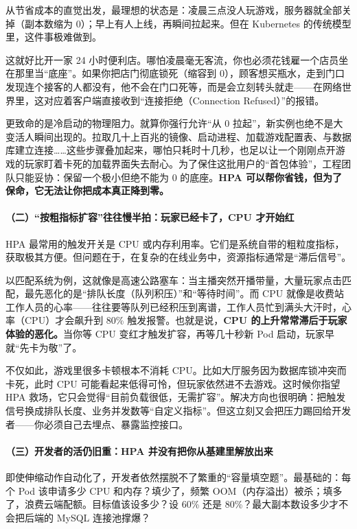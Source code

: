从节省成本的直觉出发，最理想的状态是：凌晨三点没人玩游戏，服务器就全部关掉（副本数缩为 0）；早上有人上线，再瞬间拉起来。但在 Kubernetes 的传统模型里，这件事极难做到。

这就好比开一家 24 小时便利店。哪怕凌晨毫无客流，你也必须花钱雇一个店员坐在那里当“底座”。如果你把店门彻底锁死（缩容到 0），顾客想买瓶水，走到门口发现连个接客的人都没有，他不会在门口死等，而是会立刻转头就走——在网络世界里，这对应着客户端直接收到“连接拒绝（Connection Refused）”的报错。

更致命的是冷启动的物理阻力。就算你强行允许“从 0 拉起”，新实例也绝不是大变活人瞬间出现的。拉取几十上百兆的镜像、启动进程、加载游戏配置表、与数据库建立连接……这些步骤叠加起来，哪怕只耗时十几秒，也足以让一个刚刚点开游戏的玩家盯着卡死的加载界面失去耐心。为了保住这批用户的“首包体验”，工程团队只能妥协：保留一个极小但绝不能为 0 的底座。\textbf{HPA 可以帮你省钱，但为了保命，它无法让你把成本真正降到零。}

\paragraph{（二）“按粗指标扩容”往往慢半拍：玩家已经卡了，CPU 才开始红}

HPA 最常用的触发开关是 CPU 或内存利用率。它们是系统自带的粗粒度指标，获取极其方便。但问题在于，在复杂的在线业务中，资源指标通常是“滞后信号”。

以匹配系统为例，这就像是高速公路塞车：当主播突然开播带量，大量玩家点击匹配，最先恶化的是“排队长度（队列积压）”和“等待时间”。而 CPU 就像是收费站工作人员的心率——往往要等队列已经积压到离谱，工作人员忙到满头大汗时，心率（CPU）才会飙升到 80\% 触发报警。也就是说，\textbf{CPU 的上升常常滞后于玩家体验的恶化。}当你等 CPU 变红才触发扩容，再等几十秒新 Pod 启动，玩家早就“先卡为敬”了。

不仅如此，游戏里很多卡顿根本不消耗 CPU。比如大厅服务因为数据库锁冲突而卡死，此时 CPU 可能看起来低得可怜，但玩家依然进不去游戏。这时候你指望 HPA 救场，它只会觉得“目前负载很低，无需扩容”。解决方向也很明确：把触发信号换成排队长度、业务并发数等“自定义指标”。但这立刻又会把压力踢回给开发者——你必须自己去埋点、暴露监控接口。

\paragraph{（三）开发者的活仍旧重：HPA 并没有把你从基建里解放出来}

即使伸缩动作自动化了，开发者依然摆脱不了繁重的“容量填空题”。最基础的：每个 Pod 该申请多少 CPU 和内存？填少了，频繁 OOM（内存溢出）被杀；填多了，浪费云端配额。目标值该设多少？设 60\% 还是 80\%？最大副本数设多少才不会把后端的 MySQL 连接池撑爆？

